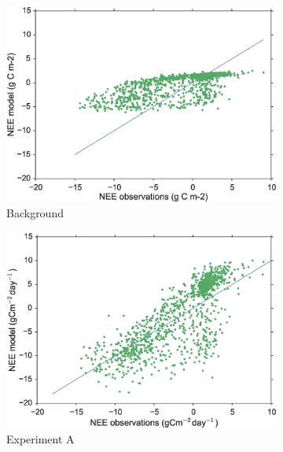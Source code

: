 \documentclass[review]{elsarticle}
\begin{document}
\begin{figure}
    \centering
     \begin{subfigure}[b]{0.49\textwidth}
        \includegraphics[width=\textwidth]{xbfscat.eps}
        \caption{Background}
        \label{fig:forecastscatxb}
    \end{subfigure}
    \begin{subfigure}[b]{0.49\textwidth}
        \includegraphics[width=\textwidth]{Afscat.eps}
        \caption{Experiment A}
        \label{fig:forecastscatBR}
    \end{subfigure}
    \begin{subfigure}[b]{0.49\textwidth}

\end{subfigure}
\end{figure}
\end{document}
